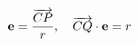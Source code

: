 \documentclass[preview]{standalone}
\begin{document}
\begin{align*}
\special{dvisvgm:raw <g id='unique000'>}\mathbf e=\frac{\overrightarrow{CP}}{r},\quad\overrightarrow{CQ}\cdot\mathbf e=r\special{dvisvgm:raw </g>}
\end{align*}
\end{document}
